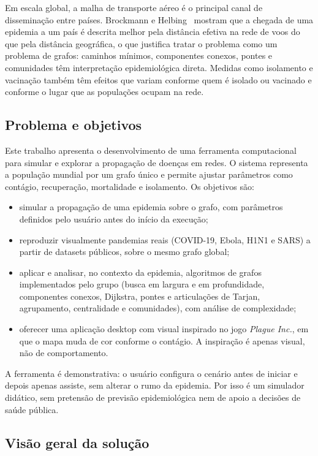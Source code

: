 \documentclass[11pt]{article}
\begin{document}
Em escala global, a malha de transporte aéreo é o principal canal de disseminação entre países. Brockmann e Helbing~\cite{brockmann2013} mostram que a chegada de uma epidemia a um país é descrita melhor pela distância efetiva na rede de voos do que pela distância geográfica, o que justifica tratar o problema como um problema de grafos: caminhos mínimos, componentes conexos, pontes e comunidades têm interpretação epidemiológica direta. Medidas como isolamento e vacinação também têm efeitos que variam conforme quem é isolado ou vacinado e conforme o lugar que as populações ocupam na rede.

\subsection{Problema e objetivos}

Este trabalho apresenta o desenvolvimento de uma ferramenta computacional para simular e explorar a propagação de doenças em redes. O sistema representa a população mundial por um grafo único e permite ajustar parâmetros como contágio, recuperação, mortalidade e isolamento. Os objetivos são:

\begin{itemize}
  \item simular a propagação de uma epidemia sobre o grafo, com parâmetros definidos pelo usuário antes do início da execução;
  \item reproduzir visualmente pandemias reais (COVID-19, Ebola, H1N1 e SARS) a partir de datasets públicos, sobre o mesmo grafo global;
  \item aplicar e analisar, no contexto da epidemia, algoritmos de grafos implementados pelo grupo (busca em largura e em profundidade, componentes conexos, Dijkstra, pontes e articulações de Tarjan, agrupamento, centralidade e comunidades), com análise de complexidade;
  \item oferecer uma aplicação desktop com visual inspirado no jogo \emph{Plague Inc.}, em que o mapa muda de cor conforme o contágio. A inspiração é apenas visual, não de comportamento.
\end{itemize}

A ferramenta é demonstrativa: o usuário configura o cenário antes de iniciar e depois apenas assiste, sem alterar o rumo da epidemia. Por isso é um simulador didático, sem pretensão de previsão epidemiológica nem de apoio a decisões de saúde pública.

\subsection{Visão geral da solução}
\end{document}
